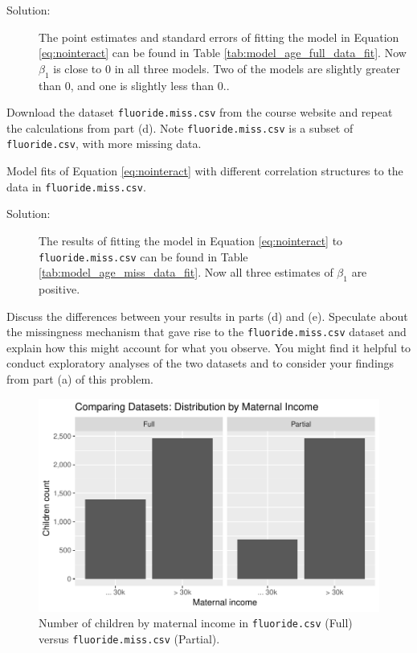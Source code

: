 \documentclass[11pt, letterpaper]{article}
\begin{document}
\begin{enumerate}[(a)]
\begin{description}
\item[Solution:] The point estimates and standard errors of fitting the model in
  Equation \ref{eq:nointeract} can be found in Table
  \ref{tab:model_age_full_data_fit}. Now $\beta_1$ is close to $0$ in all three
  models. Two of the models are slightly greater than $0$, and one is slightly
  less than $0$..
\end{description}
{\em \item Download the dataset \texttt{fluoride.miss.csv} from the course website and repeat the calculations from part (d).  Note \texttt{fluoride.miss.csv} is a subset of \texttt{fluoride.csv}, with more missing data.}
\begin{table}[ht]
  \scriptsize
  \centering
  
  \caption{Model fits of Equation \ref{eq:nointeract} with different correlation
    structures to the data in \texttt{fluoride.miss.csv}.}
  \label{tab:model_age_miss_data_fit}
\end{table}
\begin{description}
\item[Solution:] The results of fitting the model in Equation
  \ref{eq:nointeract} to \texttt{fluoride.miss.csv} can be found in Table
  \ref{tab:model_age_miss_data_fit}. Now all three estimates of $\beta_1$ are
  positive.
\end{description}
{\em \item  Discuss the differences between your results in parts (d) and (e).  Speculate
about the missingness mechanism that gave rise to the \texttt{fluoride.miss.csv} dataset and 
explain how this might account for what you observe.  You might find it
helpful to conduct exploratory analyses of the two datasets and to consider your findings from part (a) of this problem.}

\begin{figure}[ht]
  \centering
  \includegraphics{dataset_comparison.pdf}
  \caption{Number of children by maternal income in \texttt{fluoride.csv} (Full)
    versus \texttt{fluoride.miss.csv} (Partial).}
  \label{fig:dataset_comparison}
\end{figure}


\end{enumerate}
\end{document}

